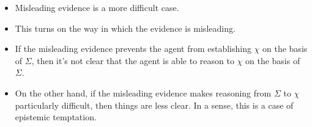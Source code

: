 \documentclass[10pt]{article}
\begin{document}
\begin{itemize}
\item Misleading evidence is a more difficult case.
\item This turns on the way in which the evidence is misleading.
\item If the misleading evidence prevents the agent from establishing \(\chi\) on the basis of \(\Sigma\), then it's not clear that the agent is able to reason to \(\chi\) on the basis of \(\Sigma\).
\item On the other hand, if the misleading evidence makes reasoning from \(\Sigma\) to \(\chi\) particularly difficult, then things are less clear.
  In a sense, this is a case of epistemic temptation.
\end{itemize}

\newpage

\printbibliography
\end{document}
